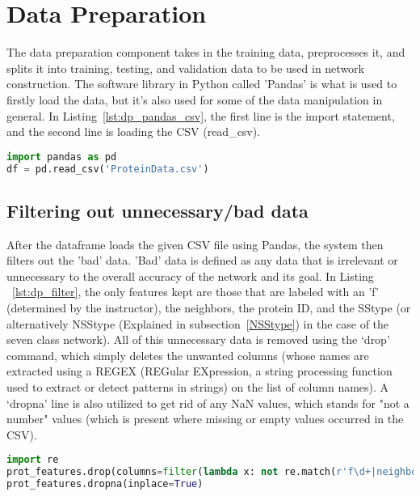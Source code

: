 \documentclass[12pt,letterpaper,oneside,reqno]{book}
\theoremstyle{plain}
\theoremstyle{definition}
\theoremstyle{plain}
\theoremstyle{remark}
\theoremstyle{plain}
\theoremstyle{definition}
\theoremstyle{plain}
\begin{document}
\section{Data Preparation}
The data preparation component takes in the training data, preprocesses it, and splits it into training, testing, and validation data to be used in network construction. The software library in Python called 'Pandas' is what is used to firstly load the data, but it's also used for some of the data manipulation in general. In Listing~\ref{lst:dp_pandas_csv}, the first line is the import statement, and the second line is loading the CSV (read\_csv).
\begin{lstlisting}[language=Python, caption={Code for Loading CSV Using Pandas}, label = lst:dp_pandas_csv, frame=single]
import pandas as pd
df = pd.read_csv('ProteinData.csv')
\end{lstlisting}

\subsection{Filtering out unnecessary/bad data} %
After the dataframe loads the given CSV file using Pandas, the system then filters out the 'bad' data. 'Bad' data is defined as any data that is irrelevant or unnecessary to the overall accuracy of the network and its goal. In Listing ~\ref{lst:dp_filter}, the only features kept are those that are labeled with an 'f' (determined by the instructor), the neighbors, the protein ID, and the SStype (or alternatively NSStype (Explained in subsection~\ref{NSStype}) in the case of the seven class network).  All of this unnecessary data is removed using the `drop' command, which simply deletes the unwanted columns (whose names are extracted using a REGEX (REGular EXpression, a string processing function used to extract or detect patterns in strings) on the list of column names). A `dropna' line is also utilized to get rid of any NaN values, which stands for "not a number" values (which is present where missing or empty values occurred in the CSV).
\begin{lstlisting}[language=Python, caption={Code for Removing Unnecessary Columns and Bad Data}, label = lst:dp_filter, frame=single]
import re
prot_features.drop(columns=filter(lambda x: not re.match(r'f\d+|neighbors|ProteinID|SStype', x) ,prot_features.columns), inplace=True)
prot_features.dropna(inplace=True)
\end{lstlisting}
\end{document}
